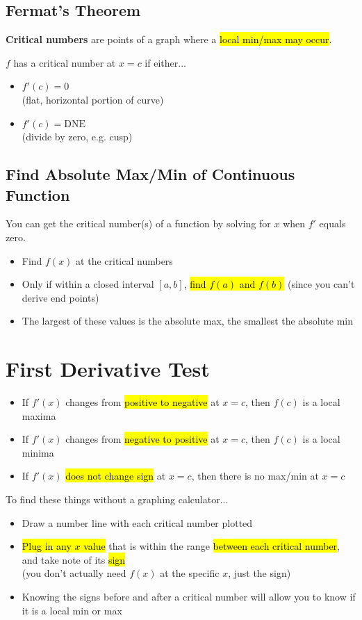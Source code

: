 \documentclass[a4paper,12pt]{article}
\begin{document}
\subsection{Fermat's Theorem}
\textbf{Critical numbers} are points of a graph where a \hl{local min/max may occur}.

$f$ has a critical number at $x = c$ if either...
\begin{itemize}
    \item{$f'(c) = 0$\\(flat, horizontal portion of curve)}
    \item{$f'(c) = \textrm{DNE}$\\(divide by zero, e.g. cusp)}
\end{itemize}

\subsection{Find Absolute Max/Min of Continuous Function}
You can get the critical number(s) of a function by solving for $x$ when $f'$ equals zero.
\begin{itemize}
    \item{Find $f(x)$ at the critical numbers}
    \item{Only if within a closed interval $[a, b]$, \hl{find $f(a)$ and $f(b)$} (since you can't derive end points)}
    \item{The largest of these values is the absolute max, the smallest the absolute min}
\end{itemize}

\section{First Derivative Test}
\begin{itemize}
    \item{If $f'(x)$ changes from \hl{positive to negative} at $x=c$, then $f(c)$ is a local maxima}
    \item{If $f'(x)$ changes from \hl{negative to positive} at $x=c$, then $f(c)$ is a local minima}
    \item{If $f'(x)$ \hl{does not change sign} at $x=c$, then there is no max/min at $x=c$}
\end{itemize}

To find these things without a graphing calculator...
\begin{itemize}
    \item{Draw a number line with each critical number plotted}
    \item{\hl{Plug in any $x$ value} that is within the range \hl{between each critical number}, and take note of its \hl{sign}\\(you don't actually need $f(x)$ at the specific $x$, just the sign)}
    \item{Knowing the signs before and after a critical number will allow you to know if it is a local min or max}
\end{itemize}
\end{document}

